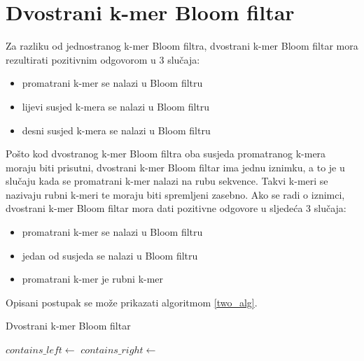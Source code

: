 \documentclass[times, utf8, seminar, numeric]{fer}
\begin{document}
\section{Dvostrani k-mer Bloom filtar}
Za razliku od jednostranog k-mer Bloom filtra, dvostrani k-mer Bloom filtar mora
rezultirati pozitivnim odgovorom u 3 slučaja:
\begin{itemize}
  \item{promatrani k-mer se nalazi u Bloom filtru}
  \item{lijevi susjed k-mera se nalazi u Bloom filtru}
  \item{desni susjed k-mera se nalazi u Bloom filtru}
\end{itemize}
Pošto kod dvostranog k-mer Bloom filtra oba susjeda promatranog k-mera moraju biti
prisutni, dvostrani k-mer Bloom filtar ima jednu iznimku, a to je u slučaju kada
se promatrani k-mer nalazi na rubu sekvence. Takvi k-meri se nazivaju rubni k-meri
te moraju biti spremljeni zasebno. Ako se radi o iznimci, dvostrani k-mer Bloom
filtar mora dati pozitivne odgovore u sljedeća 3 slučaja:
\begin{itemize}
  \item{promatrani k-mer se nalazi u Bloom filtru}
  \item{jedan od susjeda se nalazi u Bloom filtru}
  \item{promatrani k-mer je rubni k-mer}
\end{itemize}
Opisani postupak se može prikazati algoritmom \ref{two_alg}.

\begin{algorithm}[H]
  \caption{Dvostrani k-mer Bloom filtar \cite{kbf}}
  \label{two_alg}
  \begin{algorithmic}[1]
      \State $contains\_left \gets$ 
      \State $contains\_right \gets$ 
      \EndIf
        \EndIf
      \EndIf
    \EndFunction
  \end{algorithmic}
\end{algorithm}
\end{document}
